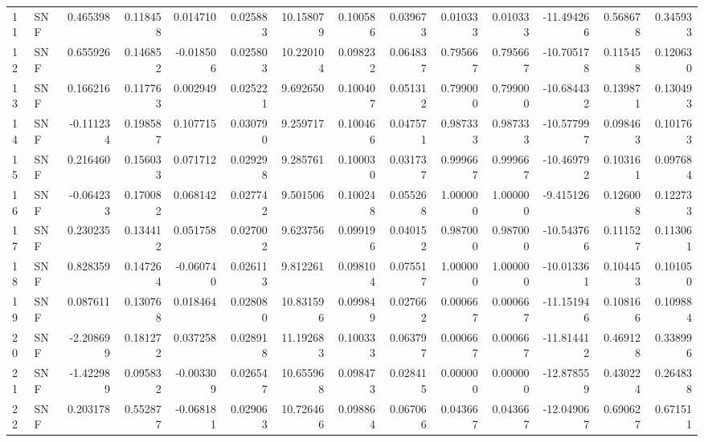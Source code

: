 \begin{tabular}{llrrrrrrrrrrrr}
11  &    SNF &  0.465398 &      0.118458 &  0.014710 &    0.025883 &  10.158079 &      0.100586 &   0.039673 &  0.010333 &  0.010333 & -11.494266 &     0.568678 &     0.345933 \\
12  &    SNF &  0.655926 &      0.146852 & -0.018506 &    0.025803 &  10.220104 &      0.098232 &   0.064837 &  0.795667 &  0.795667 & -10.705178 &     0.115458 &     0.120630 \\
13  &    SNF &  0.166216 &      0.117763 &  0.002949 &    0.025221 &   9.692650 &      0.100407 &   0.051312 &  0.799000 &  0.799000 & -10.684432 &     0.139871 &     0.130493 \\
14  &    SNF & -0.111234 &      0.198587 &  0.107715 &    0.030790 &   9.259717 &      0.100466 &   0.047571 &  0.987333 &  0.987333 & -10.577997 &     0.098463 &     0.101763 \\
15  &    SNF &  0.216460 &      0.156033 &  0.071712 &    0.029298 &   9.285761 &      0.100030 &   0.031737 &  0.999667 &  0.999667 & -10.469792 &     0.103161 &     0.097684 \\
16  &    SNF & -0.064233 &      0.170082 &  0.068142 &    0.027742 &   9.501506 &      0.100248 &   0.055268 &  1.000000 &  1.000000 &  -9.415126 &     0.126008 &     0.122733 \\
17  &    SNF &  0.230235 &      0.134412 &  0.051758 &    0.027002 &   9.623756 &      0.099196 &   0.040152 &  0.987000 &  0.987000 & -10.543766 &     0.111527 &     0.113061 \\
18  &    SNF &  0.828359 &      0.147264 & -0.060740 &    0.026113 &   9.812261 &      0.098104 &   0.075517 &  1.000000 &  1.000000 & -10.013361 &     0.104453 &     0.101050 \\
19  &    SNF &  0.087611 &      0.130768 &  0.018464 &    0.028080 &  10.831596 &      0.099849 &   0.027662 &  0.000667 &  0.000667 & -11.151946 &     0.108166 &     0.109884 \\
20  &    SNF & -2.208699 &      0.181272 &  0.037258 &    0.028918 &  11.192683 &      0.100333 &   0.063797 &  0.000667 &  0.000667 & -11.814412 &     0.469128 &     0.338996 \\
21  &    SNF & -1.422989 &      0.095832 & -0.003309 &    0.026547 &  10.655968 &      0.098473 &   0.028415 &  0.000000 &  0.000000 & -12.878559 &     0.430224 &     0.264838 \\
22  &    SNF &  0.203178 &      0.552877 & -0.068181 &    0.029063 &  10.726466 &      0.098864 &   0.067066 &  0.043667 &  0.043667 & -12.049067 &     0.690627 &     0.671511 \\

\end{tabular}
